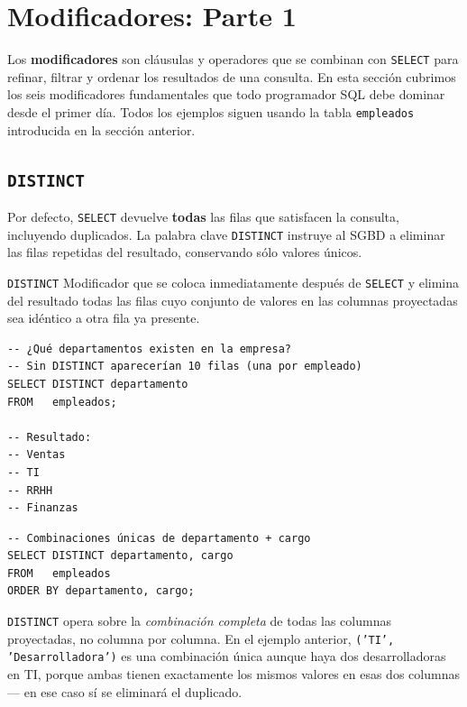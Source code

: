 \section{Modificadores: Parte 1}

Los \textbf{modificadores} son cláusulas y operadores que se
combinan con \texttt{SELECT} para refinar, filtrar y ordenar los
resultados de una consulta.
En esta sección cubrimos los seis modificadores fundamentales que
todo programador SQL debe dominar desde el primer día.
Todos los ejemplos siguen usando la tabla \texttt{empleados}
introducida en la sección anterior.

\subsection{\texttt{DISTINCT}}

Por defecto, \texttt{SELECT} devuelve \textbf{todas} las filas que
satisfacen la consulta, incluyendo duplicados.
La palabra clave \texttt{DISTINCT} instruye al SGBD a eliminar las
filas repetidas del resultado, conservando sólo valores únicos.

\begin{definicion}{\texttt{DISTINCT}}
Modificador que se coloca inmediatamente después de \texttt{SELECT}
y elimina del resultado todas las filas cuyo conjunto de valores en
las columnas proyectadas sea idéntico a otra fila ya presente.
\end{definicion}

\begin{lstlisting}[caption={DISTINCT sobre una columna.}]
-- ¿Qué departamentos existen en la empresa?
-- Sin DISTINCT aparecerían 10 filas (una por empleado)
SELECT DISTINCT departamento
FROM   empleados;

-- Resultado:
-- Ventas
-- TI
-- RRHH
-- Finanzas
\end{lstlisting}

\begin{lstlisting}[caption={DISTINCT sobre múltiples columnas.}]
-- Combinaciones únicas de departamento + cargo
SELECT DISTINCT departamento, cargo
FROM   empleados
ORDER BY departamento, cargo;
\end{lstlisting}

\begin{nota}
\texttt{DISTINCT} opera sobre la \textit{combinación completa} de
todas las columnas proyectadas, no columna por columna.
En el ejemplo anterior, \texttt{('TI', 'Desarrolladora')} es una
combinación única aunque haya dos desarrolladoras en TI, porque
ambas tienen exactamente los mismos valores en esas dos columnas
— en ese caso sí se eliminará el duplicado.
\end{nota}

